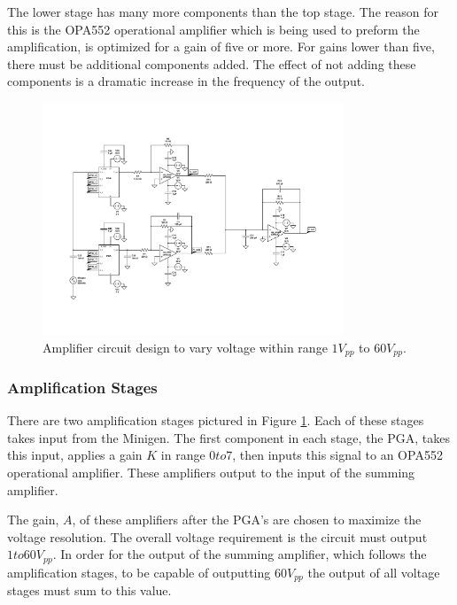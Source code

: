 \documentclass{article}	%
\begin{document}
\begin{multicols}{2}
The lower stage has many more components than the top stage.
The reason for this is the OPA552 operational amplifier which is
being used to preform the amplification,
is optimized for a gain of five or more.
For gains lower than five,
there must be additional components added.
The effect of not adding these components is a dramatic
increase in the frequency of the output.

\begin{figure}[!hbt]
\begin{center}
\includegraphics[width=0.8\textwidth,keepaspectratio]{circuit_diagram.pdf}
\end{center}
\caption{Amplifier circuit design to vary voltage 
    within range $1V_{pp}$ to $60V_{pp}$. }
\label{figure_amplifier_circuit}
\end{figure}

\subsubsection{Amplification Stages}
There are two amplification stages pictured in
Figure \ref{figure_amplifier_circuit}.
Each of these stages takes input from the Minigen.
The first component in each stage, the PGA,
takes this input,
applies a gain $K$ in range $0 to 7$, then
inputs this signal to an OPA552 operational amplifier.
These amplifiers output to the input of the summing amplifier.

The gain, $A$, of these amplifiers after the PGA's are chosen
to maximize the voltage resolution.
The overall voltage requirement is the circuit must output $1 to 60V_{pp}$.
In order for the output of the summing amplifier,
which follows the amplification stages,
to be capable of outputting $60V_{pp}$ the output of all voltage
stages must sum to this value.


\end{multicols}
\end{document}
